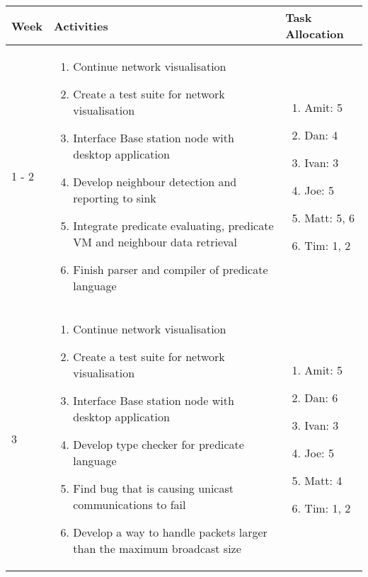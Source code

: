 \begin{center}
	\begin{longtable}{| l | p{7.5cm} | p{5cm} |}
	\hline
	Week & Activities & Task Allocation\\
	\hline
	1 - 2 & \begin{enumerate}
		\item Continue network visualisation
		\item Create a test suite for network visualisation
		\item Interface Base station node with desktop application
		\item Develop neighbour detection and reporting to sink
		\item Integrate predicate evaluating, predicate VM and neighbour data retrieval
		\item Finish parser and compiler of predicate language
		\end{enumerate} &
	\begin{enumerate}
		\item[] Amit: 5
		\item[] Dan: 4
		\item[] Ivan: 3
		\item[] Joe: 5
		\item[] Matt: 5, 6
		\item[] Tim: 1, 2
	\end{enumerate}
	\\ \hline

	3 & \begin{enumerate}
		\item Continue network visualisation
		\item Create a test suite for network visualisation
		\item Interface Base station node with desktop application
		\item Develop type checker for predicate language
		\item Find bug that is causing unicast communications to fail
		\item Develop a way to handle packets larger than the maximum broadcast size
		\end{enumerate} &
	\begin{enumerate}
		\item[] Amit: 5
		\item[] Dan: 6
		\item[] Ivan: 3
		\item[] Joe: 5
		\item[] Matt: 4
		\item[] Tim: 1, 2
	\end{enumerate}
	\\ \hline


\end{longtable}
\end{center}
